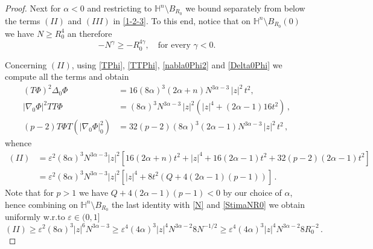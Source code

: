 \documentclass[10pt,a4paper]{amsart}
\newcommand{\He}{\mathbb{H}}
\newcommand{\eps}{\varepsilon}
\newcommand{\hLap}{\Delta_{\mathnormal{H}}}
\newcommand{\hgrad}{\nabla_{\mathnormal{H}}}
\newcommand{\hnorm}[1]{\|{#1}\|_{\mathnormal{H}}}
\begin{document}
\begin{proof}
Next for $\alpha<0$ and restricting to $\He^n\setminus B_{R_0}$ we bound separately from below the terms $(II)$ and $(III)$ in \eqref{1-2-3}.
To this end, notice that on $\He^n\setminus B_{R_0}(0)$ we have $N \geq R_0^4$ an therefore 
\begin{equation}\label{StimaNR0}
-N^{\gamma} \geq -R_0^{4\gamma}, \quad \textrm{for every } \gamma<0.
\end{equation}

\noindent Concerning $(II)$, using \eqref{TPhi}, \eqref{TTPhi}, \eqref{nabla0Phi2} and \eqref{Delta0Phi} we compute all the terms and obtain
\begin{align*}
(T\Phi)^2 \Delta_0 \Phi &= 16 (8\alpha)^3 (2\alpha +n) N^{3\alpha -3}\, |z|^2 \, t^2,\\
|\nabla_0 \Phi|^2 TT\Phi &= (8 \alpha)^3  N^{3\alpha -3}\, |z|^2 (|z|^4 + (2\alpha-1)16t^2) \, ,\\
(p-2)T\Phi T \left( |\nabla_0 \Phi|^2_0\right)&= 32  (p-2) (8\alpha)^3 (2\alpha -1)N^{3\alpha -3} \, |z|^2 \, t^2 \, ,
\end{align*}  
whence
\begin{equation}
\label{eq:II}
\begin{aligned}(II)&=\varepsilon^2 (8 \alpha)^3 N^{3\alpha-3}|z|^2 \left[ 16 (2\alpha+n) t^2+ |z|^4+16(2\alpha-1)t^2 +32(p-2)(2\alpha-1) t^2\right]\\
&=\varepsilon^2 (8 \alpha)^3 N^{3\alpha-3}|z|^2 \left[ |z|^4+ 8t^2(Q+4(2\alpha-1)(p-1))\right] \, .
\end{aligned}
\end{equation}
Note that for $p>1$ we have $Q+4(2\alpha-1)(p-1)<0$ by our choice of $\alpha$, hence combining on $\He^n\setminus B_{R_0}$ the last identity with \eqref{N} and \eqref{StimaNR0} we obtain uniformly w.r.to $\varepsilon \in (0,1]$
\begin{equation}
\label{ineq(2)}
(II) \geq  \varepsilon^2 (8 \alpha)^3 |z|^6 N^{3\alpha-3}  \geq \varepsilon^4 (4 \alpha)^3 |z|^4 N^{3\alpha-2} 8 N^{-1/2} \geq \varepsilon^4 (4 \alpha)^3 |z|^4 N^{3\alpha-2} 8 R_0^{-2}\, .
\end{equation} 


\end{proof}
\end{document}

